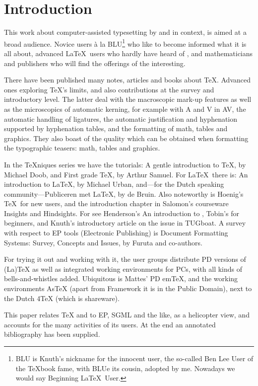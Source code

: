 \section*{Introduction}
This work about computer-assisted typesetting by \AllTeX{} and \MF{}
in context, is aimed at a broad audience.
Novice users \`a la
BLU\footnote{BLU is Knuth's nickname for the innocent user, the so-called
    Ben Lee User of the \TeX book fame, with BLUe its cousin, adopted by me.
    Nowadays we would say Beginning \LaTeX\ User.}
who like to become informed what it is all about,
advanced \LaTeX\ users who hardly have heard of \mm,
and mathematicians and publishers who will find the offerings
of the \AMS{} interesting.

There have been published many notes, articles and books about \TeX.
Advanced ones exploring \TeX's limits, and also contributions at
the survey and introductory level.
The latter deal with
the macroscopic mark-up features as well as
the microscopics of automatic kerning,
   for example with A and V in AV,
the automatic handling of ligatures,
the automatic justification and hyphenation
supported by hyphenation tables, and the formatting of
math, tables and graphics.
They also boast of the quality which can be
obtained when formatting the typographic teasers:
math, tables and graphics.

In the \TeX niques series we have the
tutorials:
A gentle introduction to \TeX, by Michael Doob, and
First grade \TeX, by Arthur Samuel.
For \LaTeX\ there is: An introduction to \LaTeX, by Michael Urban,
and---for the Dutch speaking community---Publiceren met \LaTeX, by
de Bruin.
Also noteworthy is Hoenig's \TeX\ for new users, and
the introduction chapter in Salomon's courseware Insights and Hindsights.
For \MF{} see Henderson's An introduction to \MF{},
Tobin's \MF{} for beginners, and Knuth's
introductory article on the issue in TUGboat.
A survey with respect to EP tools (Electronic Publishing) is
Document Formatting Systems:
Survey, Concepts and Issues, by Furuta and co-authors.

For trying it out and working with it, the user groups
distribute PD versions of (La)\TeX{} as well as
integrated working environments for PCs,
with all kinds of bells-and-whistles added.
Ubiquitous is Mattes' PD em\TeX, and the working environments
 As\TeX{} (apart from Framework it is
 in the Public Domain), next to the Dutch 4\TeX{} (which is shareware).

This paper  relates \TeX{} and \MF{} to EP,
SGML and the like, as a helicopter view, and accounts for the many
activities of its users.
At the end an annotated bibliography has been supplied.

